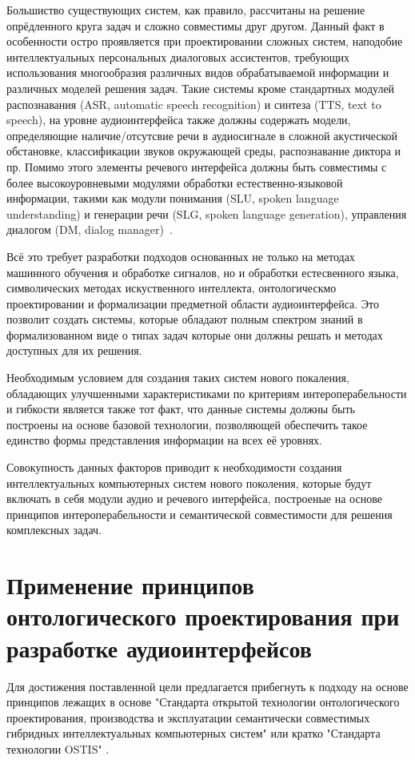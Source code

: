Большиство существующих систем, как правило, рассчитаны на решение опрёдленного круга задач и сложно совместимы друг другом. Данный факт в особенности остро проявляется при проектировании сложных систем, наподобие интеллектуальных персональных диалоговых ассистентов, требующих использования многообразия различных видов обрабатываемой информации и различных моделей решения задач. Такие системы кроме стандартных модулей распознавания (ASR, automatic speech recognition) и синтеза (TTS, text to speech), на уровне аудиоинтерфейса также должны содержать модели, определяющие наличие/отсутсвие речи в аудиосигнале в сложной акустической обстановке, классификации звуков окружающей среды, распознавание диктора и пр. Помимо этого элементы речевого интерфейса должны быть совместимы с более высокоуровневыми модулями обработки естественно-языковой информации, такими как модули понимания (SLU, spoken language understanding) и генерации речи (SLG, spoken language generation), управления диалогом (DM, dialog manager)~. 

Всё это требует разработки подходов основанных не только на методах машинного обучения и обработке сигналов, но и обработки естесвенного языка, символических методах искуственного интеллекта, онтологическмо проектировании и формализации предметной области аудиоинтерфейса. Это позволит создать системы, которые обладают полным спектром знаний в формализованном виде о типах задач которые они должны решать и методах доступных для их решения.

Необходимым условием для создания таких систем нового покаления, обладающих улучшенными характеристиками по критериям интероперабельности и гибкости является также тот факт, что данные системы должны быть построены на основе базовой технологии, позволяющей обеспечить такое единство формы представления информации на всех её уровнях.
 
Совокупность данных факторов приводит к необходимости создания интеллектуальных компьютерных систем нового поколения, которые будут включать в себя модули аудио и речевого интерфейса, построеные на основе принципов интероперабельности и семантической совместимости для решения комплексных задач.


\section{Применение принципов онтологического проектирования при разработке аудиоинтерфейсов}

Для достижения поставленной цели предлагается прибегнуть к подходу на основе принципов лежащих в основе "Стандарта открытой технологии онтологического проектирования, производства и эксплуатации семантически совместимых гибридных интеллектуальных компьютерных систем" или кратко "Стандарта технологии OSTIS" .

